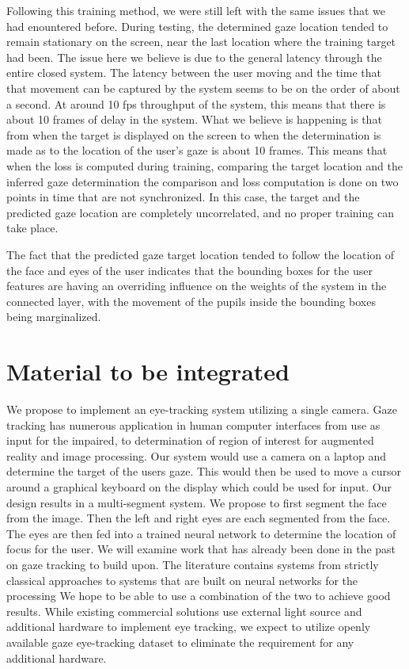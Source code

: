 \documentclass[10pt,twocolumn,letterpaper]{article}
\begin{document}
Following this training method, we were still left with the same
issues that we had enountered before. During testing, the determined
gaze location tended to remain stationary on the screen, near the last
location where the training target had been. The issue here we believe
is due to the general latency through the entire closed system. The
latency between the user moving and the time that that movement can be
captured by the system seems to be on the order of about a
second. At around 10 fps throughput of the system, this means that
there is about 10 frames of delay in the system. What we believe is
happening is that from when the target is displayed on the screen to
when the determination is made as to the location of the user's gaze
is about 10 frames. This means that when the loss is computed during
training, comparing the target location and the inferred gaze
determination the comparison and loss computation is done on two
points in time that are not synchronized. In this case, the target and
the predicted gaze location are completely uncorrelated, and no proper
training can take place.

The fact that the predicted gaze target location tended to follow the
location of the face and eyes of the user indicates that the bounding
boxes for the user features are having an overriding influence on the
weights of the system in the connected layer, with the movement of the
pupils inside the bounding boxes being marginalized.



\section{Material to be integrated}


We propose to implement an eye-tracking system utilizing a single
camera. Gaze tracking has numerous application in human computer
interfaces from use as input for the impaired\cite{calvo}, to
determination of region of interest for augmented reality and image
processing. Our system would use a camera on a laptop and determine
the target of the users gaze. This would then be used to move a cursor
around a graphical keyboard on the display which could be used for
input. Our design results in a multi-segment system. We propose to
first segment the face from the image. Then the left and right eyes
are each segmented from the face. The eyes are then fed into a trained
neural network to determine the location of focus for the user. We
will examine work that has already been done in the past on gaze
tracking to build upon. The literature contains systems from strictly
classical approaches to systems that are built on neural networks for
the processing  We hope to be able to use a
combination of the two to achieve good results. While existing
commercial solutions use external light source and additional hardware
to implement eye tracking, we expect to utilize openly available gaze
eye-tracking dataset to eliminate the requirement for any additional
hardware.
\end{document}
